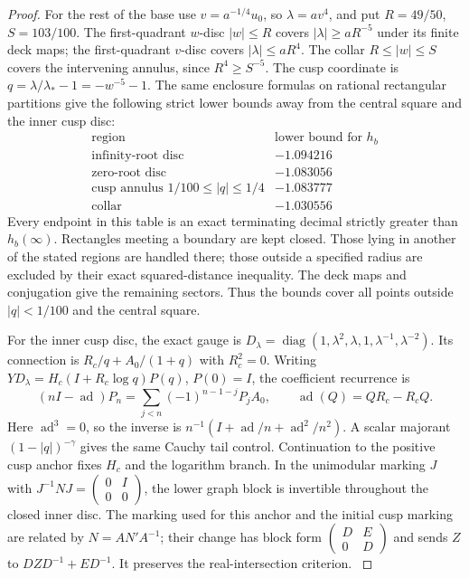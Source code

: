 \begin{proof}
For the rest of the base use $v=a^{-1/4}u_0$, so
$\lambda=av^4$, and put $R=49/50$, $S=103/100$.
The first-quadrant $w$-disc $|w|\le R$ covers
$|\lambda|\ge aR^{-5}$ under its finite deck maps; the
first-quadrant $v$-disc covers $|\lambda|\le aR^4$.
The collar $R\le|w|\le S$ covers the intervening annulus,
since $R^4\ge S^{-5}$.
The cusp coordinate is $q=\lambda/\lambda_*-1=-w^{-5}-1$.
The same enclosure formulas on rational rectangular partitions
give the following strict lower bounds away from the central
square and the inner cusp disc:
\[
\begin{array}{c|c}
\text{region}&\text{lower bound for }h_b\\\hline
\text{infinity-root disc}&-1.094216\\
\text{zero-root disc}&-1.083056\\
\text{cusp annulus }1/100\le|q|\le1/4&-1.083777\\
\text{collar}&-1.030556
\end{array}
\]
Every endpoint in this table is an exact terminating decimal
strictly greater than $h_b(\infty)$. Rectangles meeting a
boundary are kept closed. Those lying in another of the stated
regions are handled there; those outside a specified radius are
excluded by their exact squared-distance inequality. The deck
maps and conjugation give the remaining sectors. Thus the
bounds cover all points outside $|q|<1/100$ and the central
square.

For the inner cusp disc, the exact gauge is
$D_\lambda=\operatorname{diag}(1,\lambda^2,\lambda,1,\lambda^{-1},\lambda^{-2})$.
Its connection is $R_c/q+A_0/(1+q)$ with $R_c^2=0$.
Writing $YD_\lambda=H_c(I+R_c\log q)P(q)$, $P(0)=I$,
the coefficient recurrence is
\[
 (nI-\operatorname{ad})P_n
 =\sum_{j<n}(-1)^{n-1-j}P_jA_0,
 \qquad\operatorname{ad}(Q)=QR_c-R_cQ.
\]
Here $\operatorname{ad}^3=0$, so the inverse is
$n^{-1}(I+\operatorname{ad}/n+\operatorname{ad}^2/n^2)$.
A scalar majorant $(1-|q|)^{-\gamma}$ gives the same
Cauchy tail control. Continuation to the positive cusp anchor
fixes $H_c$ and the logarithm branch. In the unimodular marking
$J$ with $J^{-1}NJ=\left(\begin{smallmatrix}0&I\\0&0\end{smallmatrix}\right)$,
the lower graph block is invertible throughout the closed
inner disc. The marking used for this anchor and the initial
cusp marking are related by $N=AN'A^{-1}$; their change has
block form $\left(\begin{smallmatrix}D&E\\0&D\end{smallmatrix}\right)$
and sends $Z$ to $DZD^{-1}+ED^{-1}$. It preserves the
real-intersection criterion.
\hypertarget{tag-03L0}{}\label{layout:V:fresh-marking}


\end{proof}
